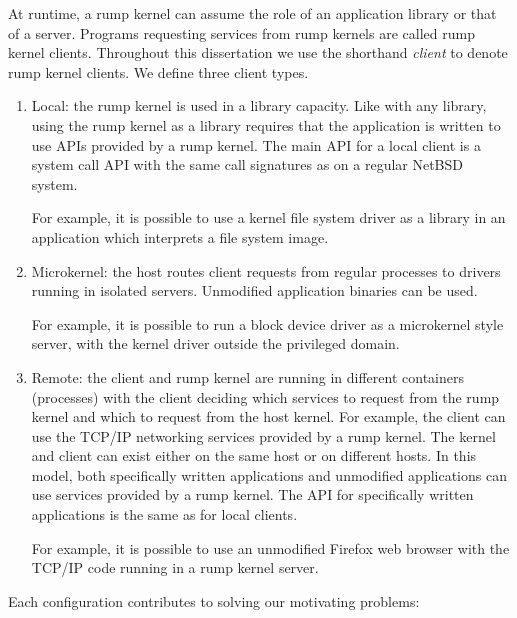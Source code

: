 At runtime, a rump kernel can assume the role of an application library
or that of a server.  Programs requesting services from rump kernels
are called rump kernel clients.  Throughout this dissertation we use
the shorthand \textit{client} to denote rump kernel clients.
We define three client types.

\begin{enumerate}
\item	Local: the rump kernel is used in a library capacity.
	Like with any library, using the rump kernel as a library requires
	that the application is written to use APIs provided by a rump
	kernel.  The main API for a local client is a system call API
	with the same call signatures as on a regular NetBSD system.

	For example, it is possible to use a kernel file system driver as
	a library in an application which interprets a file system image.

\item   Microkernel: the host routes client requests from regular
	processes to drivers running in isolated servers.
	Unmodified application binaries can be used.

	For example, it is possible to run a block device driver as a
	microkernel style server, with the kernel driver outside the
	privileged domain.

\item   Remote: the client and rump kernel are running in
	different containers (processes) with the client deciding
	which services to request from the rump kernel and which to
	request from the host kernel.  For example, the client can
	use the TCP/IP networking services provided by a rump
	kernel.  The kernel and client can exist either on the same
	host or on different hosts.  In this model, both
	specifically written applications and unmodified applications
	can use services provided by a rump kernel.  The API for
	specifically written applications is the same as for local
	clients.

	For example, it is possible to use an unmodified Firefox web
	browser with the TCP/IP code running in a rump kernel server.
\end{enumerate}

Each configuration contributes to solving our motivating problems:

